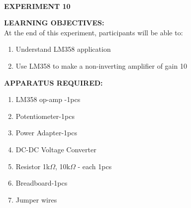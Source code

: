 \documentclass[12pt,a4paper]{article}
\begin{document}
\begin{center}

\textbf{\large \\EXPERIMENT 10 }\\[6pt]
\end{center}

\textbf{\large LEARNING OBJECTIVES:}\\[3pt]
At the end of this experiment, participants will be able to:\vspace{-6mm}\begin{enumerate}
 \setlength\itemsep{-0.3em}
\item Understand LM358 application \\
\item Use LM358 to make a non-inverting amplifier of gain 10 \\

\end{enumerate}
\textbf{\large APPARATUS REQUIRED:}\\
\vspace{-3mm}
\begin{enumerate}
 \setlength\itemsep{-0.3em}
\item LM358 op-amp -1pcs \\
\item Potentiometer-1pcs\\
\item Power Adapter-1pcs\\
\item DC-DC Voltage Converter\\
\item Resistor 1k$\Omega$, 10k$\Omega$ - each 1pcs\\
\item Breadboard-1pcs\\
\item Jumper wires\\

\end{enumerate}
\end{document}
